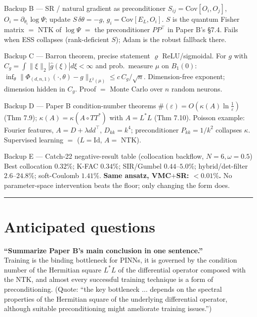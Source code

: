 \documentclass[11pt]{article}
\begin{document}
\begin{slide}{Backup B --- SR / natural gradient as preconditioner}
$S_{ij}=\mathrm{Cov}[O_i,O_j]$, $O_i=\partial_{\theta_i}\log\Psi$; update $S\,\delta\theta=-g$,
$g_i=\mathrm{Cov}[E_L,O_i]$. $S$ is the quantum Fisher matrix $=$ NTK of $\log\Psi$ $=$ the
preconditioner $P P^\top$ in Paper B's \S7.4. Fails when ESS collapses (rank-deficient $S$); Adam is
the robust fallback there.
\end{slide}

\begin{slide}{Backup C --- Barron theorem, precise statement}
$\varrho$ ReLU/sigmoidal. For $g$ with $C_g=\int\|\xi\|_2|\hat g(\xi)|d\xi<\infty$ and prob.\ measure
$\mu$ on $B_1(0)$:
$\inf_\theta\|\Phi_{(d,n,1)}(\cdot,\theta)-g\|_{L^2(\mu)}\le c\,C_g/\sqrt n$.
Dimension-free exponent; dimension hidden in $C_g$. Proof $=$ Monte Carlo over $n$ random neurons.
\end{slide}

\begin{slide}{Backup D --- Paper B condition-number theorems}
$\#(\varepsilon)=O(\kappa(A)\ln\tfrac1\varepsilon)$ (Thm 7.9); $\kappa(A)=\kappa(A\circ TT^\ast)$
with $A=L^\ast L$ (Thm 7.10). Poisson example: Fourier features, $A=D+\lambda dd^\top$, $D_{kk}=k^4$;
preconditioner $P_{kk}=1/k^2$ collapses $\kappa$. Supervised learning $=$ ($L=\mathrm{Id}$, $A=$ NTK).
\end{slide}

\begin{slide}{Backup E --- Catch-22 negative-result table (collocation backflow, $N{=}6,\omega{=}0.5$)}
Best collocation $0.32\%$; K-FAC $0.34\%$; SIR/Gumbel $0.44$--$5.0\%$; hybrid/det-filter
$2.6$--$24.8\%$; soft-Coulomb $1.41\%$. \textbf{Same ansatz, VMC$+$SR: $<0.01\%$.} No parameter-space
intervention beats the floor; only changing the form does.
\end{slide}

\vspace{1em}\hrule\vspace{1em}

\section*{Anticipated questions}

\begin{anticipate}
\textbf{``Summarize Paper B's main conclusion in one sentence.''}\\
Training is the binding bottleneck for PINNs, it is governed by the condition number of the Hermitian
square $L^\ast L$ of the differential operator composed with the NTK, and almost every successful
training technique is a form of preconditioning. (Quote: ``the key bottleneck $\dots$ depends on the
spectral properties of the Hermitian square of the underlying differential operator, although suitable
preconditioning might ameliorate training issues.'')
\end{anticipate}
\end{document}
